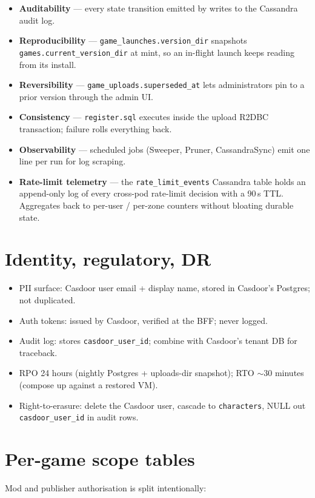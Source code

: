 \documentclass[11pt,a4paper,openany]{book}
\begin{document}
\begin{itemize}
  \item \textbf{Auditability} --- every state transition emitted by
         writes to the Cassandra audit log.
  \item \textbf{Reproducibility} ---
        \texttt{game\_launches.version\_dir} snapshots
        \texttt{games.current\_version\_dir} at mint, so an in-flight
        launch keeps reading from its install.
  \item \textbf{Reversibility} ---
        \texttt{game\_uploads.superseded\_at} lets administrators pin
        to a prior version through the admin UI.
  \item \textbf{Consistency} --- \texttt{register.sql} executes inside
        the upload R2DBC transaction; failure rolls everything back.
  \item \textbf{Observability} --- scheduled jobs (Sweeper, Pruner,
        CassandraSync) emit one line per run for log scraping.
  \item \textbf{Rate-limit telemetry} --- the
        \texttt{rate\_limit\_events} Cassandra table holds an
        append-only log of every cross-pod rate-limit decision with a
        90\,s TTL. Aggregates back to per-user / per-zone counters
        without bloating durable state.
\end{itemize}

\chapter{Identity, regulatory, DR}
\begin{itemize}
  \item PII surface: Casdoor user email + display name, stored in
        Casdoor's Postgres; not duplicated.
  \item Auth tokens: issued by Casdoor, verified at the BFF; never
        logged.
  \item Audit log: stores \texttt{casdoor\_user\_id}; combine with
        Casdoor's tenant DB for traceback.
  \item RPO 24 hours (nightly Postgres + uploads-dir snapshot); RTO
        $\sim$30 minutes (compose up against a restored VM).
  \item Right-to-erasure: delete the Casdoor user, cascade to
        \texttt{characters}, NULL out \texttt{casdoor\_user\_id} in
        audit rows.
\end{itemize}

\chapter{Per-game scope tables}
Mod and publisher authorisation is split intentionally:
\end{document}
